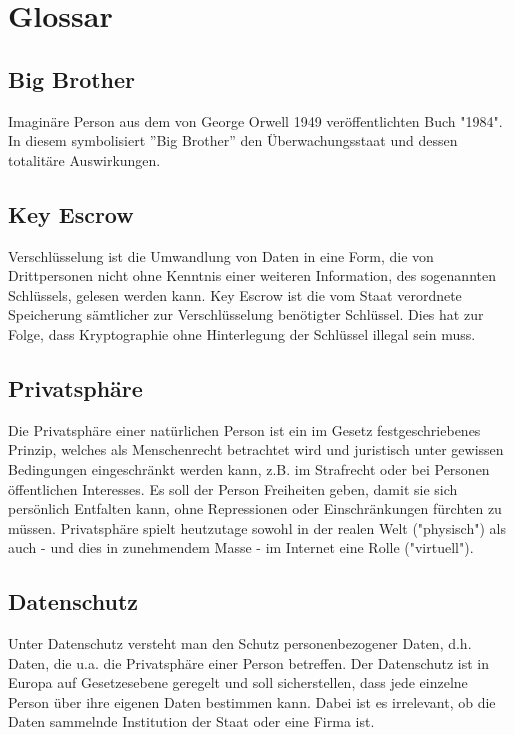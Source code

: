 \section{Glossar}
	
	\subsection{Big Brother}
	  Imaginäre Person aus dem von George Orwell 1949 veröffentlichten 
	  Buch "1984". In diesem symbolisiert ''Big Brother'' den Überwachungsstaat und
	  dessen totalitäre Auswirkungen. 
	
	\subsection{Key Escrow}
	  Verschlüsselung ist die Umwandlung von Daten in eine Form, die von Drittpersonen nicht ohne 
	  Kenntnis einer weiteren Information, des sogenannten Schlüssels,
	  gelesen werden kann.
	  Key Escrow ist die vom Staat verordnete Speicherung sämtlicher zur Verschlüsselung 
	  benötigter Schlüssel. Dies hat zur Folge, dass 
	  Kryptographie ohne Hinterlegung der Schlüssel illegal sein muss. 
	
	\subsection{Privatsphäre}
	  Die Privatsphäre einer natürlichen Person ist ein im Gesetz 
	  festgeschriebenes Prinzip, welches als Menschenrecht betrachtet wird und 
	  juristisch unter gewissen Bedingungen eingeschränkt werden kann, z.B. 
	  im Strafrecht oder bei Personen öffentlichen Interesses. Es soll der 
	  Person Freiheiten geben, damit sie sich persönlich Entfalten 
	  kann, ohne Repressionen oder Einschränkungen fürchten zu müssen. 
	  Privatsphäre spielt heutzutage sowohl in der realen Welt ("physisch") 
	  als auch - und dies in zunehmendem Masse - im Internet eine Rolle 
	  ("virtuell"). 
	
	\subsection{Datenschutz}
	  Unter Datenschutz versteht man den Schutz personenbezogener Daten, d.h. 
	  Daten, die u.a. die Privatsphäre einer Person betreffen. Der 
	  Datenschutz ist in Europa auf Gesetzesebene geregelt und soll 
	  sicherstellen, dass jede einzelne Person über ihre eigenen Daten 
	  bestimmen kann. Dabei ist es irrelevant, ob die Daten sammelnde 
	  Institution der Staat oder eine Firma ist. 


